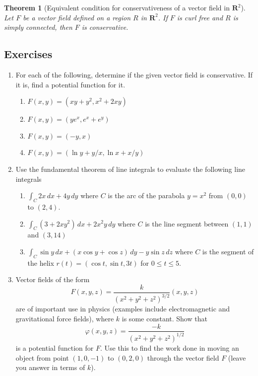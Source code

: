 \documentclass[12pt]{article}
\numberwithin{equation}{subsection}
\numberwithin{figure}{subsection}
\newtheorem{thm}[subsection]{Theorem}
\theoremstyle{note}
\begin{document}
{%


\begin{thm}[Equivalent condition for conservativeness of a vector field in $\mathbf{R}^2$]
Let $F$ be a vector field defined on a region $R$ in $\mathbf{R}^2$. If $F$ is curl free and $R$ is simply connected, then $F$ is conservative.
\end{thm}


\subsection{Exercises}
\begin{enumerate}[label=\arabic*.]

\item For each of the following, determine if the given vector field is conservative. If it is, find a potential function for it. 

\begin{enumerate}
	\item $F(x,y)=( xy+y^2, x^2+2xy)$
	\item $F(x,y)=(ye^x, e^x+e^y)$
	\item $F(x,y)=(-y,x)$
	\item $F(x,y)=(\ln y +y/x, \ln x+x/y)$
\end{enumerate}

\item Use the fundamental theorem of line integrals to evaluate the following line integrals

\begin{enumerate}
	\item $\displaystyle \int_C 2x \,dx + 4y \,dy$ where $C$ is the arc of the parabola $y=x^2$ from $(0,0)$ to $(2,4)$.
	\item $\displaystyle \int_C (3+2xy^2)\,dx+ 2x^2y\,dy$ where $C$ is the line segment between $(1,1)$ and $(3,14)$
	\item $\displaystyle \int_C \sin y \,dx + (x\cos y+\cos z) \,dy-y \sin z\,dz$ where $C$ is the segment of the helix $r(t)=(\cos t, \sin t, 3t)$ for $0\leq t\leq 5$.
\end{enumerate}

\item Vector fields of the form \[ F(x,y,z)= \dfrac{k}{(x^2+y^2+z^2)^{3/2}} (x,y,z)\] are of important use in physics (examples include electromagnetic and gravitational force fields), where $k$ is some constant. Show that \[\varphi(x,y,z)= \dfrac{-k}{(x^2+y^2+z^2)^{1/2}}\] is a potential function for $F$. Use this to find the work done in moving an object from point $(1,0,-1)$ to $(0,2,0)$ through the vector field $F$ (leave you answer in terms of $k$). 


\end{enumerate}}
\end{document}
